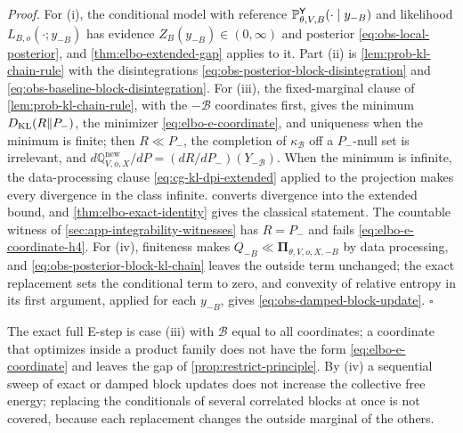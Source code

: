 \noindent\emph{Proof.}
For (i), the conditional model with reference
$\mathbb P^{\mathsf Y}_{\theta,V,B}(\cdot\mid y_{-B})$ and likelihood
$L_{B,o}(\cdot;y_{-B})$ has evidence $Z_B(y_{-B})\in(0,\infty)$ and posterior
\eqref{eq:obs-local-posterior}, and \cref{thm:elbo-extended-gap} applies to it.
Part (ii) is \cref{lem:prob-kl-chain-rule} with the disintegrations
\eqref{eq:obs-posterior-block-disintegration} and
\eqref{eq:obs-baseline-block-disintegration}. For (iii), the fixed-marginal
clause of \cref{lem:prob-kl-chain-rule}, with the $-\mathcal B$ coordinates
first, gives the minimum $D_{\mathrm{KL}}(R\Vert P_-)$, the minimizer
\eqref{eq:elbo-e-coordinate}, and uniqueness when the minimum is finite; then
$R\ll P_-$, the completion of $\kappa_{\mathcal B}$ off a $P_-$-null set is
irrelevant, and $d\mathbb Q^{\mathrm{new}}_{V,o,X}/dP=(dR/dP_-)(Y_{-\mathcal B})$.
When the minimum is infinite, the data-processing clause
\eqref{eq:cg-kl-dpi-extended} applied to the projection makes every divergence
in the class infinite.  converts divergence into the
extended bound, and \cref{thm:elbo-exact-identity} gives the classical
statement. The countable witness of \cref{sec:app-integrability-witnesses} has
$R=P_-$ and fails \eqref{eq:elbo-e-coordinate-h4}. For (iv), finiteness makes
$Q_{-B}\ll\boldsymbol\Pi_{\theta,V,o,X,-B}$ by data processing, and
\eqref{eq:obs-posterior-block-kl-chain} leaves the outside term unchanged; the
exact replacement sets the conditional term to zero, and convexity of relative
entropy in its first argument, applied for each $y_{-B}$, gives
\eqref{eq:obs-damped-block-update}. \hfill$\square$

The exact full E-step is case (iii) with $\mathcal B$ equal to all
coordinates; a coordinate that optimizes inside a product family does not have
the form \eqref{eq:elbo-e-coordinate} and leaves the gap of
\cref{prop:restrict-principle}. By (iv) a sequential sweep of exact or damped
block updates does not increase the collective free energy; replacing the
conditionals of several correlated blocks at once is not covered, because each
replacement changes the outside marginal of the others.

